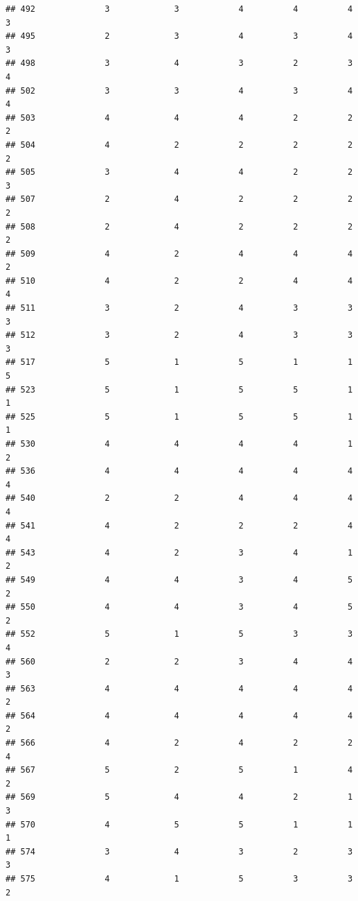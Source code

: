 \documentclass[
]{article}
\begin{document}
\begin{verbatim}
## 492              3             3            4          4          4        3
## 495              2             3            4          3          4        3
## 498              3             4            3          2          3        4
## 502              3             3            4          3          4        4
## 503              4             4            4          2          2        2
## 504              4             2            2          2          2        2
## 505              3             4            4          2          2        3
## 507              2             4            2          2          2        2
## 508              2             4            2          2          2        2
## 509              4             2            4          4          4        2
## 510              4             2            2          4          4        4
## 511              3             2            4          3          3        3
## 512              3             2            4          3          3        3
## 517              5             1            5          1          1        5
## 523              5             1            5          5          1        1
## 525              5             1            5          5          1        1
## 530              4             4            4          4          1        2
## 536              4             4            4          4          4        4
## 540              2             2            4          4          4        4
## 541              4             2            2          2          4        4
## 543              4             2            3          4          1        2
## 549              4             4            3          4          5        2
## 550              4             4            3          4          5        2
## 552              5             1            5          3          3        4
## 560              2             2            3          4          4        3
## 563              4             4            4          4          4        2
## 564              4             4            4          4          4        2
## 566              4             2            4          2          2        4
## 567              5             2            5          1          4        2
## 569              5             4            4          2          1        3
## 570              4             5            5          1          1        1
## 574              3             4            3          2          3        3
## 575              4             1            5          3          3        2

\end{verbatim}
\end{document}
